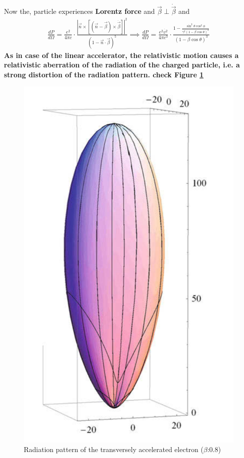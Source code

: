 \documentclass[11pt]{report}
\newcommand{\de}[2]{\frac{d{#1}}{d{#2}}}
\newcommand{\rr}[1]{\left[{#1}\right]}
\newcommand{\vd}[1]{\dot{\vec{#1}}}
\begin{document}
 Now the, particle experiences \textbf{Lorentz force} and $\vec{\beta} \perp \vd{\beta}$ and 
\begin{eqnarray}
\de{P}{\Omega}=\frac{e^2}{4 \pi c} \cdot \frac{|\vec{n}\times \rr{(\vec{n}-\vec{\beta})\times\dot{\vec{\beta}}}|^2}{(1- \vec{n}\cdot \vec{\beta})^5}
\implies \de{P}{\Omega}=\frac{e^2 \dot{v^2}}{4 \pi c^3} \cdot \frac{1-\frac{\sin^2 \theta \cos^2 \phi }{\gamma^2(1-\beta \cos \theta)^2}}{(1-\beta \cos \theta)^3}
\end{eqnarray}
\textbf{As in case of the linear accelerator, the relativistic motion causes a relativistic aberration of the radiation of the charged particle, i.e. a strong distortion of the radiation pattern. check Figure \ref{figtracpa}}
\begin{figure}[h!]\label{figtracpa}
\includegraphics[scale=1]{figtracpa.png}
\caption{Radiation pattern of the transversely accelerated electron ($\beta$:0.8)}
\end{figure}
\end{document}
